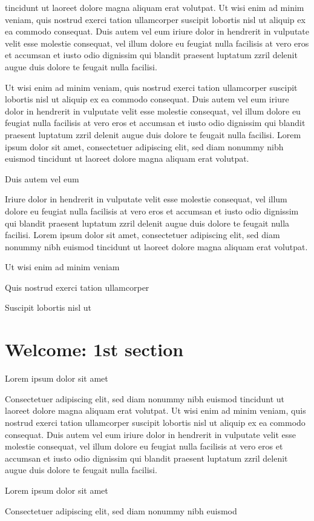 \documentclass[11pt]{article}\makeatletter
\makeatletter
\renewcommand\section{\@startsection {section}{1}{\z@}%
     {-1.75ex \@plus -0.5ex \@minus -.2ex}%
     {0.5ex \@plus .2ex}%
     {\reset@font\Large\bfseries\sffamily}}
\def\chaptername{Chapter}
\def\mainmatter{%
  \cleardoublepage
  \def\thechapter{\@arabic\c@chapter}
  \setcounter{chapter}{0}
  \setcounter{section}{0}
  \pagenumbering{arabic}
  \setcounter{secnumdepth}{6}
  \def\@chapapp{\chaptername}%
  \def\theHchapter{\arabic{chapter}}
}
\def\DivI{\section}
\def\DivI{\chapter}
\makeatother
\begin{document}
      tincidunt ut laoreet dolore magna aliquam erat volutpat. Ut wisi enim
      ad minim veniam, quis nostrud exerci tation ullamcorper suscipit
      lobortis nisl ut aliquip ex ea commodo consequat. Duis autem vel eum
      iriure dolor in hendrerit in vulputate velit esse molestie consequat,
      vel illum dolore eu feugiat nulla facilisis at vero eros et accumsan
      et iusto odio dignissim qui blandit praesent luptatum zzril delenit
      augue duis dolore te feugait nulla facilisi.\par Ut wisi enim ad minim veniam, quis nostrud exerci tation
      ullamcorper suscipit lobortis nisl ut aliquip ex ea commodo
      consequat. Duis autem vel eum iriure dolor in hendrerit in vulputate
      velit esse molestie consequat, vel illum dolore eu feugiat nulla
      facilisis at vero eros et accumsan et iusto odio dignissim qui blandit
      praesent luptatum zzril delenit augue duis dolore te feugait nulla
      facilisi. Lorem ipsum dolor sit amet, consectetuer adipiscing elit,
      sed diam nonummy nibh euismod tincidunt ut laoreet dolore magna
      aliquam erat volutpat. \par Duis autem vel eum \par Iriure dolor in hendrerit in vulputate velit esse molestie
      consequat, vel illum dolore eu feugiat nulla facilisis at vero eros et
      accumsan et iusto odio dignissim qui blandit praesent luptatum zzril
      delenit augue duis dolore te feugait nulla facilisi. Lorem ipsum dolor
      sit amet, consectetuer adipiscing elit, sed diam nonummy nibh euismod
      tincidunt ut laoreet dolore magna aliquam erat volutpat. \par Ut wisi enim ad minim veniam\par Quis nostrud exerci tation ullamcorper \par Suscipit lobortis nisl ut \mainmatter 
\DivI[Welcome: 1st section]{Welcome: 1st section}\label{part1}\par Lorem ipsum dolor sit amet\par Consectetuer adipiscing elit, sed diam nonummy nibh euismod
      tincidunt ut laoreet dolore magna aliquam erat volutpat. Ut wisi enim
      ad minim veniam, quis nostrud exerci tation ullamcorper suscipit
      lobortis nisl ut aliquip ex ea commodo consequat. Duis autem vel eum
      iriure dolor in hendrerit in vulputate velit esse molestie consequat,
      vel illum dolore eu feugiat nulla facilisis at vero eros et accumsan
      et iusto odio dignissim qui blandit praesent luptatum zzril delenit
      augue duis dolore te feugait nulla facilisi.\par Lorem ipsum dolor sit amet\par Consectetuer adipiscing elit, sed diam nonummy nibh euismod
\end{document}
